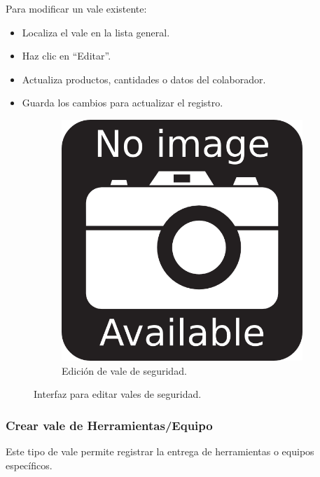 Para modificar un vale existente:

\begin{itemize}
    \item Localiza el vale en la lista general.
    \item Haz clic en “Editar”.
    \item Actualiza productos, cantidades o datos del colaborador.
    \item Guarda los cambios para actualizar el registro.
\end{itemize}

\begin{figure}[h]
\centering
\begin{subfigure}{0.4\textwidth}
    \includegraphics[width=\textwidth]{imgs/no-image.png}
    \caption{Edición de vale de seguridad.}
    \label{fig:operaciones3}
\end{subfigure}
\caption{Interfaz para editar vales de seguridad.}
\end{figure}

\subsubsection{Crear vale de Herramientas/Equipo}

Este tipo de vale permite registrar la entrega de herramientas o equipos específicos.


